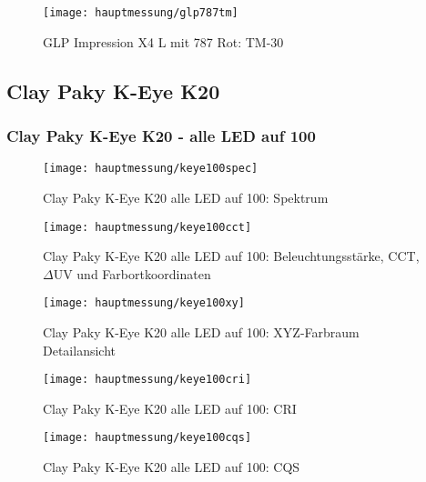 \documentclass[pagesize,paper=A4,fontsize=12pt,utf8,numbers=noenddot,bibliography=totoc,listof=totoc,DIV=11,BCOR=1mm]{scrreprt}
\begin{document}
\begin{figure}[htp]     %
\centering
\texttt{[image: hauptmessung/glp787tm]} 
\caption {GLP Impression X4 L mit 787 Rot: TM-30} 
\end{figure}

\subsection{Clay Paky K-Eye K20}

\subsubsection{Clay Paky K-Eye K20 - alle LED auf 100}

\begin{figure}[htp]     %
\centering
\texttt{[image: hauptmessung/keye100spec]} 
\caption {Clay Paky K-Eye K20 alle LED auf 100: Spektrum} 
\end{figure}

\begin{figure}[htp]     %
\centering
\texttt{[image: hauptmessung/keye100cct]} 
\caption {Clay Paky K-Eye K20 alle LED auf 100: Beleuchtungsstärke, CCT, $\Delta$UV und Farbortkoordinaten} 
\end{figure}

\begin{figure}[htp]     %
\centering
\texttt{[image: hauptmessung/keye100xy]} 
\caption {Clay Paky K-Eye K20 alle LED auf 100: XYZ-Farbraum Detailansicht} 
\end{figure}

\begin{figure}[htp]     %
\centering
\texttt{[image: hauptmessung/keye100cri]} 
\caption {Clay Paky K-Eye K20 alle LED auf 100: CRI} 
\end{figure}

\begin{figure}[htp]     %
\centering
\texttt{[image: hauptmessung/keye100cqs]} 
\caption {Clay Paky K-Eye K20 alle LED auf 100: CQS} 
\end{figure}
\end{document}
